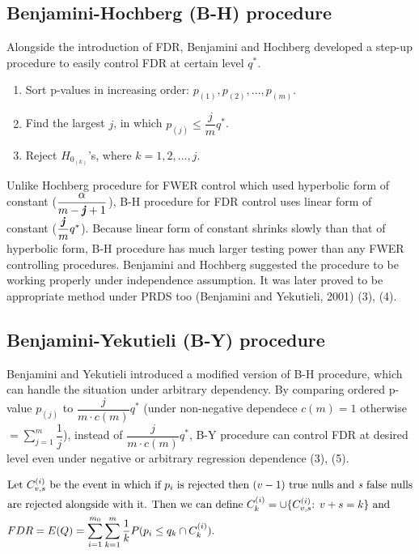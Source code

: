 \documentclass[a4paper, 11pt, oneside]{article}
\begin{document}
\subsection{Benjamini-Hochberg (B-H) procedure}
Alongside the introduction of FDR, Benjamini and Hochberg developed a step-up procedure to easily control FDR at certain level $q^*$.
\begin{enumerate}
  \item Sort p-values in increasing order: $p_{(1)}, p_{(2)}, ..., p_{(m)}$.
  \item Find the largest $j$, in which $p_{(j)} \leq \dfrac{j}{m}q^*$.
  \item Reject $H_{0_{(k)}}$'s, where $k=1, 2, ..., j$.
\end{enumerate}
Unlike Hochberg procedure for FWER control which used hyperbolic form of constant ($\dfrac{\alpha}{m-\textbf{\textit{j}}+1}$), B-H procedure for FDR control uses linear form of constant ($\dfrac{\textbf{\textit{j}}}{m}q^*$). Because linear form of constant shrinks slowly than that of hyperbolic form, B-H procedure has much larger testing power than any FWER controlling procedures. Benjamini and Hochberg suggested the procedure to be working properly under independence assumption. It was later proved to be appropriate method under PRDS too (Benjamini and Yekutieli, 2001) (3), (4).


\subsection{Benjamini-Yekutieli (B-Y) procedure}
Benjamini and Yekutieli introduced a modified version of B-H procedure, which can handle the situation under arbitrary dependency. By comparing ordered p-value $p_{(j)}$ to $\dfrac{j}{m \cdot c(m)}q^*$ (under non-negative dependece $c(m)=1$ otherwise $=\sum_{j=1}^m \dfrac{1}{j}$), instead of $\dfrac{j}{m \cdot c(m)}q^*$, B-Y procedure can control FDR at desired level even under negative or arbitrary regression dependence (3), (5).

\begin{equation}
\begin{aligned}\label{proof-by1}
& \text{Let } C_{v, s}^{(i)} \text{ be the event in which if } p_i \text{ is rejected then } (v-1) \text{ true nulls and \textit{s} false nulls}\\
& \text{are rejected alongside with it. Then we can define } C_k^{(i)}=\cup \{C_{v,s}^{(i)} \text{: } v+s=k \} \text{ and } \\
& FDR=E(Q)=\sum_{i=1}^{m_0} \sum_{k=1}^m \dfrac{1}{k}P(p_i \leq q_k \cap C_k^{(i)}).\\
\end{aligned}
\end{equation}
\end{document}
